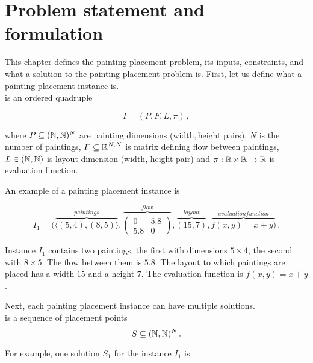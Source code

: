 \chapter{Problem statement and formulation}\label{ch:problem-statement-and-formulation}

This chapter defines the painting placement problem, its inputs, constraints, and what a solution to the painting placement problem is.
First, let us define what a painting placement instance is.\\

 is an ordered quadruple

\begin{equation}
    I = (P, F, L, \pi)\,,
    \label{eq:painting-placement-instance}
\end{equation}

where $P \subseteq (\operatorname*{\mathbb{N}}, \operatorname*{\mathbb{N}})^N$ are painting dimensions (width$, $height pairs),
$N$ is the number of paintings,
$F \subseteq \operatorname*{\mathbb{R}}^{N, N}$ is matrix defining flow between paintings,
$L \in (\operatorname*{\mathbb{N}}, \operatorname*{\mathbb{N}})$ is layout dimension (width, height pair)
and $\pi: \operatorname*{\mathbb{R}} \times \operatorname*{\mathbb{R}} \to \operatorname*{\mathbb{R}}$ is evaluation function.

An example of a painting placement instance is

\[
    I_1 = (\overbrace{\langle (5,4),(8,5) \rangle}^{paintings},
    \overbrace{\begin{pmatrix}
                   0   & 5.8 \\
                   5.8 & 0
    \end{pmatrix}}^{flow},
    \overbrace{(15,7)}^{layout},
    \overbrace{f(x,y) = x+y)}^{evaluation function}\,.
\]

Instance $I_1$ contains two paintings, the first with dimensions $5\times4$, the second with $8\times5$.
The flow between them is $5.8$.
The layout to which paintings are placed has a width $15$ and a height $7$.
The evaluation function is $f(x,y) = x+y$.

Next, each painting placement instance can have multiple solutions.\\

 is a sequence of placement points
\begin{equation}
    S \subseteq (\operatorname*{\mathbb{N}},\operatorname*{\mathbb{N}})^N  \,.
    \label{eq:painting-placement-solution}
\end{equation}

For example, one solution $S_1$ for the instance $I_1$ is

